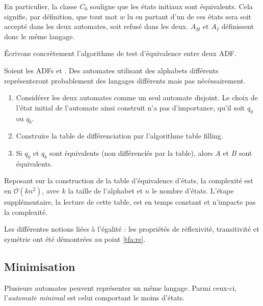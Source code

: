 En particulier, la classe $C_0$ souligne que les états initiaux sont équivalents. Cela signifie, par définition, que tout mot $w$ lu en partant d'un de ces états sera soit accepté dans les deux automates, soit refusé dans les deux. $A_H$ et $A_I$ définissent donc le même langage.

Écrivons concrètement l'algorithme de test d'équivalence entre deux ADF.
\begin{algo}\label{alg:eqauto}
  Soient les ADFs \automaton et \automatonbis. Des automates utilisant des alphabets différents représenteront probablement des langages différents mais pas nécéssairement.
  \begin{enumerate}
    \item Considérer les deux automates comme un seul automate disjoint. Le choix de l'état initial de l'automate ainsi construit n'a pas d'importance, qu'il soit $q_0$ ou $q_b$.
    \item Construire la table de différenciation par l'algorithme table filling.
    \item Si $q_0$ et $q_b$ sont équivalents (non différenciés par la table), alors $A$ et $B$ sont équivalents.
  \end{enumerate}

\end{algo}


\begin{complexity}
 Reposant sur la construction de la table d'équivalence d'états, la complexité est en $\mathcal{O}(kn^2)$, avec $k$ la taille de l'alphabet et $n$ le nombre d'états. L'étape supplémentaire, la lecture de cette table, est en temps constant et n'impacte pas la complexité.
\end{complexity}


Les différentes notions liées à l'égalité : les propriétés de réflexivité, transitivité et symétrie ont été démontrées au point \ref{tfa:re}.



\subsection{Minimisation}\label{tfa:mini}

Plusieurs automates peuvent représenter un même langage. Parmi ceux-ci, l'\emph{automate minimal} est celui comportant le moins d'états.


